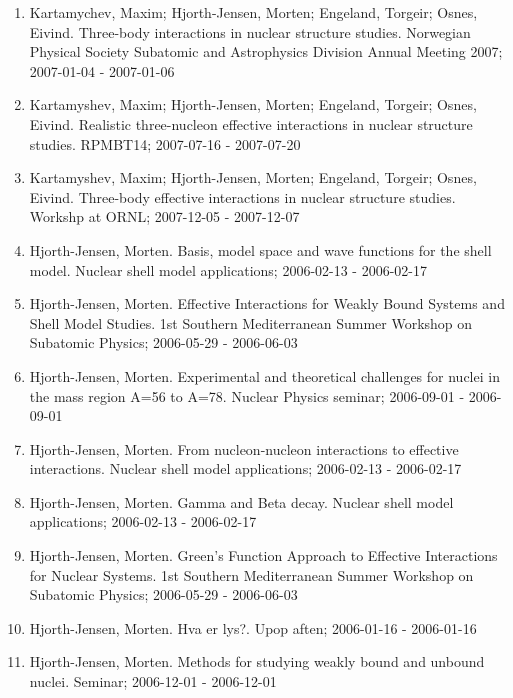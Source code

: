 \documentclass[a4wide,10pt]{article}
\begin{document}
\begin{enumerate}
\item Kartamychev, Maxim; Hjorth-Jensen, Morten; Engeland, Torgeir; Osnes, Eivind.  Three-body interactions in nuclear structure studies. Norwegian Physical Society Subatomic and Astrophysics Division Annual Meeting 2007; 2007-01-04 - 2007-01-06

\item Kartamyshev, Maxim; Hjorth-Jensen, Morten; Engeland, Torgeir; Osnes, Eivind.  Realistic three-nucleon effective interactions in nuclear structure studies. RPMBT14; 2007-07-16 - 2007-07-20

\item Kartamyshev, Maxim; Hjorth-Jensen, Morten; Engeland, Torgeir; Osnes, Eivind.  Three-body effective interactions in nuclear structure studies. Workshp at ORNL; 2007-12-05 - 2007-12-07

\item Hjorth-Jensen, Morten.  Basis, model space and wave functions for the shell model. Nuclear shell model applications; 2006-02-13 - 2006-02-17

\item Hjorth-Jensen, Morten.  Effective Interactions for Weakly Bound Systems and Shell Model Studies. 1st Southern Mediterranean Summer Workshop on Subatomic Physics; 2006-05-29 - 2006-06-03

\item Hjorth-Jensen, Morten.  Experimental and theoretical challenges for nuclei in the mass region A=56 to A=78. Nuclear Physics seminar; 2006-09-01 - 2006-09-01

\item Hjorth-Jensen, Morten.  From nucleon-nucleon interactions to effective interactions. Nuclear shell model applications; 2006-02-13 - 2006-02-17

\item Hjorth-Jensen, Morten.  Gamma and Beta decay. Nuclear shell model applications; 2006-02-13 - 2006-02-17

\item Hjorth-Jensen, Morten.  Green's Function Approach to Effective Interactions for Nuclear Systems. 1st Southern Mediterranean Summer Workshop on Subatomic Physics; 2006-05-29 - 2006-06-03

\item Hjorth-Jensen, Morten.  Hva er lys?. Upop aften; 2006-01-16 - 2006-01-16

\item Hjorth-Jensen, Morten.  Methods for studying weakly bound and unbound nuclei. Seminar; 2006-12-01 - 2006-12-01


\end{enumerate}
\end{document}
